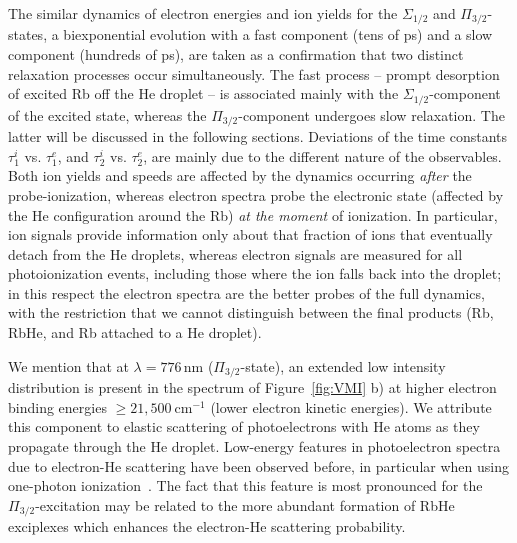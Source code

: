 The similar dynamics of electron energies and ion yields for the $\Sigma_{1/2}$ and $\Pi_{3/2}$-states, a biexponential evolution with a fast component (tens of ps) and a slow component (hundreds of ps), are taken as a confirmation that two distinct relaxation processes occur simultaneously. The fast process -- prompt desorption of excited Rb off the He droplet -- is associated mainly with the $\Sigma_{1/2}$-component of the excited state, whereas the $\Pi_{3/2}$-component undergoes slow relaxation. The latter will be discussed in the following sections. Deviations of the time constants $\tau^i_1$ vs. $\tau_1^e$, and $\tau^i_2$ vs. $\tau_2^e$, are mainly due to the different nature of the observables. Both ion yields and speeds are affected by the dynamics occurring \textit{after} the probe-ionization, whereas electron spectra probe the electronic state (affected by the He configuration around the Rb) \textit{at the moment} of ionization. In particular, ion signals provide information only about that fraction of ions that eventually detach from the He droplets, whereas electron signals are measured for all photoionization events, including those where the ion falls back into the droplet; in this respect the electron spectra are the better probes of the full dynamics, with the restriction that we cannot distinguish between the final products (Rb, RbHe, and Rb attached to a He droplet).


We mention that at $\lambda=776$\,nm ($\Pi_{3/2}$-state), an extended low intensity distribution is present in the spectrum of Figure~\ref{fig:VMI} b) at higher electron binding energies $\geq 21,500~$cm$^{-1}$ (lower electron kinetic energies). We attribute this component to elastic scattering of photoelectrons with He atoms as they propagate through the He droplet. Low-energy features in photoelectron spectra due to electron-He scattering have been observed before, in particular when using one-photon ionization~\cite{Loginov:2005,Peterka:2006,Wang:2008,Buchta:2013}. The fact that this feature is most pronounced for the $\Pi_{3/2}$-excitation may be related to the more abundant formation of RbHe exciplexes which enhances the electron-He scattering probability.

